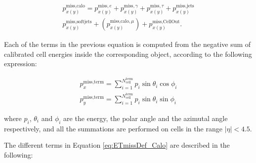 \begin{equation}
\begin{split}
p_{x(y)}^{\text{miss,calo}} = p_{x(y)}^{\text{miss},e} + p_{x(y)}^{\text{miss},\gamma} + p_{x(y)}^{\text{miss},\tau} + p_{x(y)}^{\text{miss,jets}} \\
    p_{x(y)}^{\text{miss,softjets}} + (p_{x(y)}^{\text{miss,calo},\mu}) + p_{x(y)}^{\text{miss,CellOut}}.
\end{split}
\label{eq:ETmissDef_Calo}
\end{equation}

Each of the terms in the previous equation is computed from the negative sum of calibrated cell energies inside the corresponding object, according to the following expression:

\begin{equation}
\begin{split}
p_{x}^{\text{miss,term}} = \sum_{i=1}^{N_{\text{cell}}^{\text{term}}}{p_i \sin{\theta_i}\cos{\phi_i}} \\
p_{y}^{\text{miss,term}} = \sum_{i=1}^{N_{\text{cell}}^{\text{term}}}{p_i \sin{\theta_i}\sin{\phi_i}}
\end{split}
\label{eq:ETmissDef_Split}
\end{equation}

\noindent where $p_i$, $\theta_i$ and $\phi_i$ are the energy, the polar angle and the azimutal angle respectively, and all the summations are performed on cells in the range $|\eta|<4.5$.

The different terms in Equation \ref{eq:ETmissDef_Calo} are described in the following:

